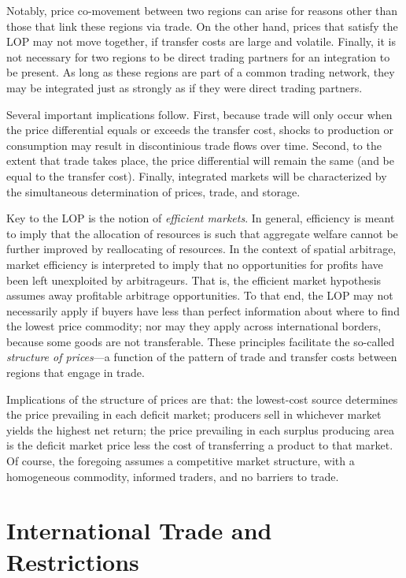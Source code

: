 \documentclass[
]{book}
\begin{document}
Notably, price co-movement between two regions can arise for reasons other than those that link these regions via trade. On the other hand, prices that satisfy the LOP may not move together, if transfer costs are large and volatile. Finally, it is not necessary for two regions to be direct trading partners for an integration to be present. As long as these regions are part of a common trading network, they may be integrated just as strongly as if they were direct trading partners.

Several important implications follow. First, because trade will only occur when the price differential equals or exceeds the transfer cost, shocks to production or consumption may result in discontinious trade flows over time. Second, to the extent that trade takes place, the price differential will remain the same (and be equal to the transfer cost). Finally, integrated markets will be characterized by the simultaneous determination of prices, trade, and storage.

Key to the LOP is the notion of \emph{efficient markets}. In general, efficiency is meant to imply that the allocation of resources is such that aggregate welfare cannot be further improved by reallocating of resources. In the context of spatial arbitrage, market efficiency is interpreted to imply that no opportunities for profits have been left unexploited by arbitrageurs. That is, the efficient market hypothesis assumes away profitable arbitrage opportunities. To that end, the LOP may not necessarily apply if buyers have less than perfect information about where to find the lowest price commodity; nor may they apply across international borders, because some goods are not transferable. These principles facilitate the so-called \emph{structure of prices}---a function of the pattern of trade and transfer costs between regions that engage in trade.

Implications of the structure of prices are that: the lowest-cost source determines the price prevailing in each deficit market; producers sell in whichever market yields the highest net return; the price prevailing in each surplus producing area is the deficit market price less the cost of transferring a product to that market. Of course, the foregoing assumes a competitive market structure, with a homogeneous commodity, informed traders, and no barriers to trade.

\hypertarget{international-trade-and-restrictions}{%
\chapter{International Trade and Restrictions}\label{international-trade-and-restrictions}}
\end{document}
